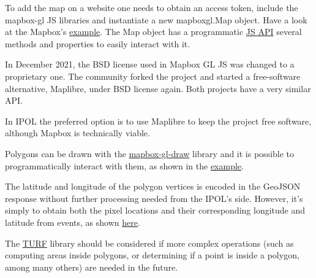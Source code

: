 To add the map on a website one needs to obtain an access token, include the mapbox-gl JS libraries and instantiate a new mapboxgl.Map object. Have a look at the Mapbox's \href{https://docs.mapbox.com/mapbox-gl-js/example/simple-map/}{example}. The Map object has a programmatic \href{https://docs.mapbox.com/mapbox-gl-js/api/map/}{JS API} several methods and properties to easily interact with it.

In December 2021, the BSD license used in Mapbox GL JS was changed to a proprietary one. The community forked the project and started a free-software alternative, Maplibre, under BSD license again. Both projects have a very similar API.

In IPOL the preferred option is to use Maplibre to keep the project free software, although Mapbox is technically viable.

Polygons can be drawn with the \href{https://github.com/mapbox/mapbox-gl-draw}{mapbox-gl-draw} library and it is possible to programmatically interact with them, as shown in the \href{https://docs.mapbox.com/mapbox-gl-js/example/mapbox-gl-draw/}{example}.

The latitude and longitude of the polygon vertices is encoded in the GeoJSON response without further processing needed from the IPOL's side. However, it's simply to obtain both the pixel locations and their corresponding longitude and latitude from events, as shown \href{https://docs.mapbox.com/mapbox-gl-js/example/mouse-position/}{here}.

The \href{http://turfjs.org/}{TURF} library should be considered if more complex operations (such as computing areas inside polygons, or determining if a point is inside a polygon, among many others) are needed in the future.
